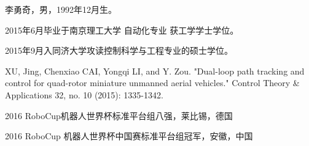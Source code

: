 \begin{resume}

	李勇奇，男，1992年12月生。

	2015年6月毕业于南京理工大学 自动化专业 获工学学士学位。

	2015年9月入同济大学攻读控制科学与工程专业的硕士学位。

	\begin{enumerate}[{[}1{]}]
	\item XU, Jing, Chenxiao CAI, Yongqi LI, and Y. Zou. "Dual-loop path tracking and control for quad-rotor miniature unmanned aerial vehicles." Control Theory \& Applications 32, no. 10 (2015): 1335-1342.
	\end{enumerate}


	\begin{enumerate}[{[}1{]}]
	\item 2016 RoboCup机器人世界杯标准平台组八强，莱比锡，德国
	\item 2016 RoboCup 机器人世界杯中国赛标准平台组冠军，安徽，中国
	\end{enumerate}
\end{resume}

